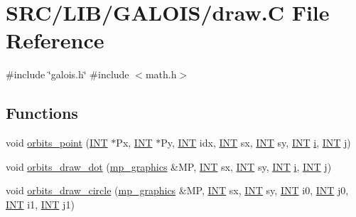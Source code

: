 \hypertarget{draw_8_c}{}\section{S\+R\+C/\+L\+I\+B/\+G\+A\+L\+O\+I\+S/draw.C File Reference}
\label{draw_8_c}
{\ttfamily \#include \char`\"{}galois.\+h\char`\"{}}\newline
{\ttfamily \#include $<$math.\+h$>$}\newline
\subsection*{Functions}
\begin{DoxyCompactItemize}
\item 
void \mbox{\hyperlink{draw_8_c_a2c437e67c2fe1c2693cccb961c9c185e}{orbits\+\_\+point}} (\mbox{\hyperlink{galois_8h_a09fddde158a3a20bd2dcadb609de11dc}{I\+NT}} $\ast$Px, \mbox{\hyperlink{galois_8h_a09fddde158a3a20bd2dcadb609de11dc}{I\+NT}} $\ast$Py, \mbox{\hyperlink{galois_8h_a09fddde158a3a20bd2dcadb609de11dc}{I\+NT}} idx, \mbox{\hyperlink{galois_8h_a09fddde158a3a20bd2dcadb609de11dc}{I\+NT}} sx, \mbox{\hyperlink{galois_8h_a09fddde158a3a20bd2dcadb609de11dc}{I\+NT}} sy, \mbox{\hyperlink{galois_8h_a09fddde158a3a20bd2dcadb609de11dc}{I\+NT}} \mbox{\hyperlink{alphabet2_8_c_acb559820d9ca11295b4500f179ef6392}{i}}, \mbox{\hyperlink{galois_8h_a09fddde158a3a20bd2dcadb609de11dc}{I\+NT}} \mbox{\hyperlink{alphabet2_8_c_a37d972ae0b47b9099e30983131d31916}{j}})
\item 
void \mbox{\hyperlink{draw_8_c_a20a270e8cc52b4a32cdd36bfa75d849e}{orbits\+\_\+draw\+\_\+dot}} (\mbox{\hyperlink{classmp__graphics}{mp\+\_\+graphics}} \&MP, \mbox{\hyperlink{galois_8h_a09fddde158a3a20bd2dcadb609de11dc}{I\+NT}} sx, \mbox{\hyperlink{galois_8h_a09fddde158a3a20bd2dcadb609de11dc}{I\+NT}} sy, \mbox{\hyperlink{galois_8h_a09fddde158a3a20bd2dcadb609de11dc}{I\+NT}} \mbox{\hyperlink{alphabet2_8_c_acb559820d9ca11295b4500f179ef6392}{i}}, \mbox{\hyperlink{galois_8h_a09fddde158a3a20bd2dcadb609de11dc}{I\+NT}} \mbox{\hyperlink{alphabet2_8_c_a37d972ae0b47b9099e30983131d31916}{j}})
\item 
void \mbox{\hyperlink{draw_8_c_aab67c26d29e82151142b788f15c5fe1e}{orbits\+\_\+draw\+\_\+circle}} (\mbox{\hyperlink{classmp__graphics}{mp\+\_\+graphics}} \&MP, \mbox{\hyperlink{galois_8h_a09fddde158a3a20bd2dcadb609de11dc}{I\+NT}} sx, \mbox{\hyperlink{galois_8h_a09fddde158a3a20bd2dcadb609de11dc}{I\+NT}} sy, \mbox{\hyperlink{galois_8h_a09fddde158a3a20bd2dcadb609de11dc}{I\+NT}} i0, \mbox{\hyperlink{galois_8h_a09fddde158a3a20bd2dcadb609de11dc}{I\+NT}} j0, \mbox{\hyperlink{galois_8h_a09fddde158a3a20bd2dcadb609de11dc}{I\+NT}} i1, \mbox{\hyperlink{galois_8h_a09fddde158a3a20bd2dcadb609de11dc}{I\+NT}} j1)

\end{DoxyCompactItemize}
